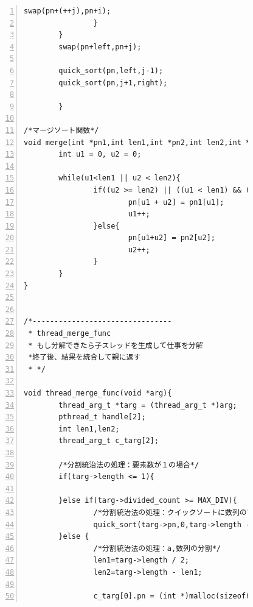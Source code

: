 \documentclass[11pt,a4paper]{jsarticle}
\begin{document}
\begin{figure}[htbp]
 \begin{center}
  \begin{Verbatim}[frame=single,baselinestretch=1,fontsize=\footnotesize,numbers=left]
  						swap(pn+(++j),pn+i);
				}
		}
		swap(pn+left,pn+j);

		quick_sort(pn,left,j-1);
		quick_sort(pn,j+1,right);

		}

/*マージソート関数*/
void merge(int *pn1,int len1,int *pn2,int len2,int *pn){
		int u1 = 0, u2 = 0;

		while(u1<len1 || u2 < len2){
				if((u2 >= len2) || ((u1 < len1) && (pn1[u1] < pn2[u2]))){
						pn[u1 + u2] = pn1[u1];
						u1++;
				}else{
						pn[u1+u2] = pn2[u2];
						u2++;
				}
		}
}


/*--------------------------------
 * thread_merge_func
 * もし分解できたら子スレッドを生成して仕事を分解
 *終了後、結果を統合して親に返す
 * */

void thread_merge_func(void *arg){
		thread_arg_t *targ = (thread_arg_t *)arg;
		pthread_t handle[2];
		int len1,len2;
		thread_arg_t c_targ[2];

        /*分割統治法の処理：要素数が１の場合*/
		if(targ->length <= 1){

		}else if(targ->divided_count >= MAX_DIV){
				/*分割統治法の処理：クイックソートに数列のソート*/
				quick_sort(targ->pn,0,targ->length - 1);
		}else {
				/*分割統治法の処理：a,数列の分割*/
				len1=targ->length / 2;
				len2=targ->length - len1;

				c_targ[0].pn = (int *)malloc(sizeof(int) * len1);
  \end{Verbatim}
 \end{center}
\end{figure}
\end{document}
